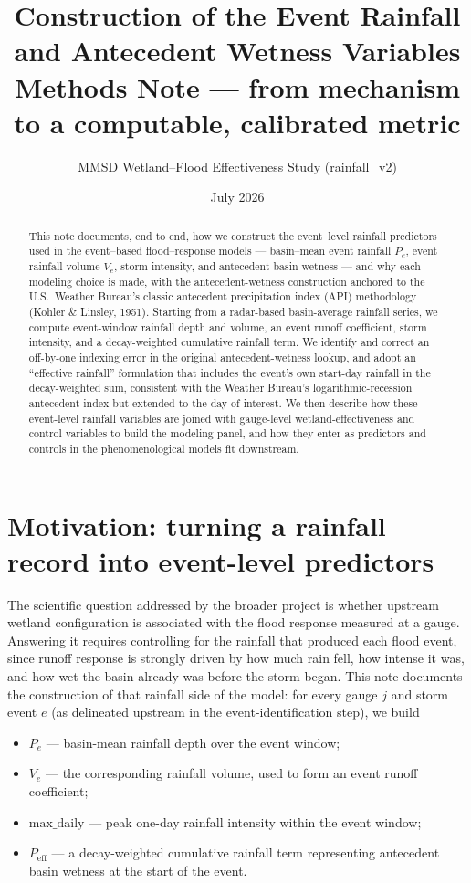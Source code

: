 \documentclass[11pt]{article}
\title{\textbf{Construction of the Event Rainfall and Antecedent Wetness Variables} \\[4pt]
\large Methods Note --- from mechanism to a computable, calibrated metric}
\author{MMSD Wetland--Flood Effectiveness Study (rainfall\_v2)}
\date{July 2026}
\begin{document}
\maketitle

\begin{abstract}
This note documents, end to end, how we construct the event--level rainfall predictors used in
the event--based flood--response models --- basin--mean event rainfall $P_e$, event rainfall
volume $V_e$, storm intensity, and antecedent basin wetness --- and why each modeling choice is
made, with the antecedent-wetness construction anchored to the U.S.\ Weather Bureau's classic
antecedent precipitation index (API) methodology (Kohler \& Linsley, 1951). Starting from a
radar-based basin-average rainfall series, we compute event-window rainfall depth and volume, an
event runoff coefficient, storm intensity, and a decay-weighted cumulative rainfall term. We
identify and correct an off-by-one indexing error in the original antecedent-wetness lookup, and
adopt an ``effective rainfall'' formulation that includes the event's own start-day rainfall in
the decay-weighted sum, consistent with the Weather Bureau's logarithmic-recession antecedent
index but extended to the day of interest. We then describe how these event-level rainfall
variables are joined with gauge-level wetland-effectiveness and control variables to build the
modeling panel, and how they enter as predictors and controls in the phenomenological models fit
downstream.
\end{abstract}

\section{Motivation: turning a rainfall record into event-level predictors}

The scientific question addressed by the broader project is whether upstream wetland
configuration is associated with the flood response measured at a gauge. Answering it requires
controlling for the rainfall that produced each flood event, since runoff response is strongly
driven by how much rain fell, how intense it was, and how wet the basin already was before the
storm began. This note documents the construction of that rainfall side of the model: for every
gauge $j$ and storm event $e$ (as delineated upstream in the event-identification step), we
build

\begin{itemize}[nosep]
  \item $P_{e}$ --- basin-mean rainfall depth over the event window;
  \item $V_{e}$ --- the corresponding rainfall volume, used to form an event runoff coefficient;
  \item $\text{max\_daily}$ --- peak one-day rainfall intensity within the event window;
  \item $P_{\text{eff}}$ --- a decay-weighted cumulative rainfall term representing antecedent
        basin wetness at the start of the event.
\end{itemize}
\end{document}
